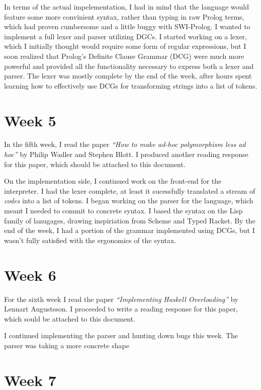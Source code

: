 \documentclass[11pt,a4paper]{article}
\begin{document}
In terms of the actual impelementation, I had in mind that the language would
feature some more convinient syntax, rather than typing in raw Prolog terms,
which had proven cumbersome and a little buggy with SWI-Prolog. I wanted to
implement a full lexer and parser utilizing DGCs. I started working on a lexer,
which I initially thought would require some form of regular expressions, but I
soon realized that Prolog's Definite Clause Grammar (DCG) were much more powerful
and provided all the functionality necessary to express both a lexer and parser.
The lexer was mostly complete by the end of the week, after hours spent learning
how to effectively use DCGs for transforming strings into a list of tokens.

\section*{Week 5}

In the fifth week, I read the paper \textit{``How to make ad-hoc polymorphism
less ad hoc''} by Philip Wadler and Stephen Blott. I produced another reading
response for this paper, which should be attached to this document.

On the implementation side, I continued work on the front-end for the interpreter.
I had the lexer complete, at least it sucessfully translated a stream of
\textit{codes} into a list of tokens. I began working on the parser for the language,
which meant I needed to commit to concrete syntax. I based the syntax on the Lisp
family of lanugages, drawing inspiriation from Scheme and Typed Racket. By the
end of the week, I had a portion of the grammar implemented using DCGs, but I wasn't
fully satisfied with the ergonomics of the syntax.

\section*{Week 6}

For the sixth week I read the paper \textit{``Implementing Haskell Overloading''}
by Lennart Augustsson. I proceeded to write a reading response for this paper,
which sould be attached to this document.

I continued implementing the parser and hunting down bugs this week. The parser
was taking a more concrete shape

\section*{Week 7}
\end{document}
